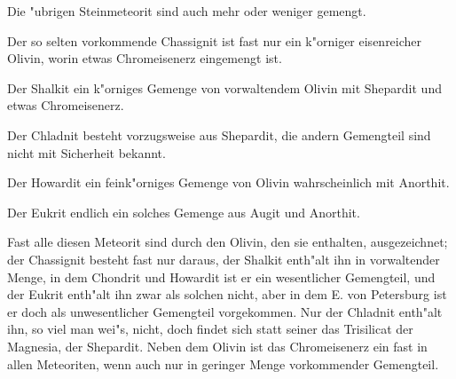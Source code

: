 \documentclass[a4paper, 11pt, oneside, german]{article}
\begin{document}
Die "ubrigen Steinmeteorit sind auch mehr oder weniger gemengt.

Der so selten vorkommende Chassignit ist fast nur ein k"orniger eisenreicher Olivin, worin etwas Chromeisenerz eingemengt ist.

Der Shalkit ein k"orniges Gemenge von vorwaltendem Olivin mit Shepardit und etwas Chromeisenerz.

Der Chladnit besteht vorzugsweise aus Shepardit, die andern Gemengteil sind nicht mit Sicherheit bekannt.

Der Howardit ein feink"orniges Gemenge von Olivin wahrscheinlich mit Anorthit.

Der Eukrit endlich ein solches Gemenge aus Augit und Anorthit.

Fast alle diesen Meteorit sind durch den Olivin, den sie enthalten, ausgezeichnet; der Chassignit besteht fast nur daraus, der Shalkit enth"alt ihn in vorwaltender Menge, in dem Chondrit und Howardit ist er ein wesentlicher Gemengteil, und der Eukrit enth"alt ihn zwar als solchen nicht, aber in dem E. von Petersburg ist er doch als unwesentlicher Gemengteil vorgekommen. Nur der Chladnit enth"alt ihn, so viel man wei"s, nicht, doch findet sich statt seiner das Trisilicat der Magnesia, der Shepardit. Neben dem Olivin ist das Chromeisenerz ein fast in allen Meteoriten, wenn auch nur in geringer Menge vorkommender Gemengteil.
\end{document}
